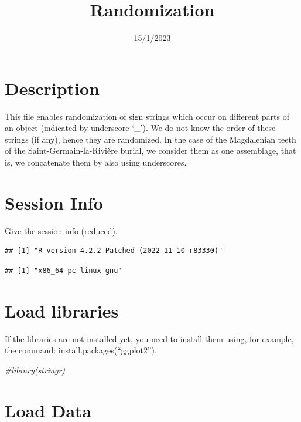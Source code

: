 \documentclass[
]{article}
\title{Randomization}
\author{}
\date{\vspace{-2.5em}15/1/2023}
\newenvironment{Shaded}{\begin{snugshade}}{\end{snugshade}}
\newcommand{\CommentTok}[1]{\textcolor[rgb]{0.56,0.35,0.01}{\textit{#1}}}
\begin{document}
\maketitle

\hypertarget{description}{%
\section{Description}\label{description}}

This file enables randomization of sign strings which occur on different
parts of an object (indicated by underscore `\_'). We do not know the
order of these strings (if any), hence they are randomized. In the case
of the Magdalenian teeth of the Saint-Germain-la-Rivière burial, we
consider them as one assemblage, that is, we concatenate them by also
using underscores.

\hypertarget{session-info}{%
\section{Session Info}\label{session-info}}

Give the session info (reduced).

\begin{verbatim}
## [1] "R version 4.2.2 Patched (2022-11-10 r83330)"
\end{verbatim}

\begin{verbatim}
## [1] "x86_64-pc-linux-gnu"
\end{verbatim}

\hypertarget{load-libraries}{%
\section{Load libraries}\label{load-libraries}}

If the libraries are not installed yet, you need to install them using,
for example, the command: install.packages(``ggplot2'').

\begin{Shaded}
\begin{Highlighting}[]
\CommentTok{\#library(stringr)}
\end{Highlighting}
\end{Shaded}

\hypertarget{load-data}{%
\section{Load Data}\label{load-data}}
\end{document}
